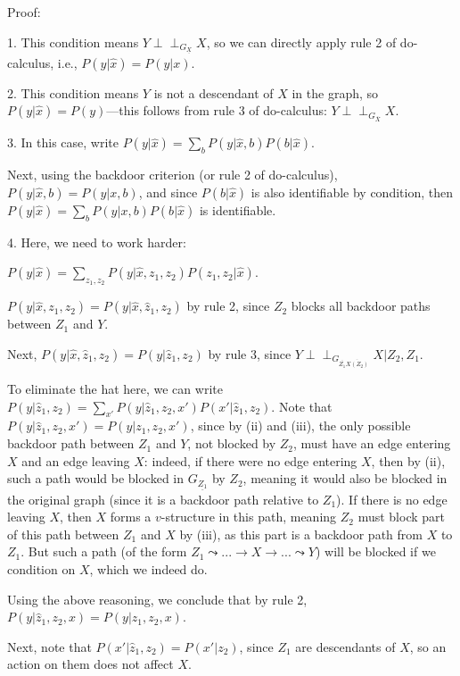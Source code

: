 \documentclass[fleqn]{article}
\newcommand{\independent}{\perp \!\!\! \perp}
\numberwithin{equation}{section}
\numberwithin{theorem}{section}
\numberwithin{figure}{section}
\numberwithin{lemma}{section}
\numberwithin{corollary}{section}
\begin{document}
Proof:

1. This condition means $Y \independent_{G_{\underline{X}}} X$, so we can directly apply rule 2 of do-calculus, i.e., $P(y|\hat x) = P(y|x)$.

2. This condition means $Y$ is not a descendant of $X$ in the graph, so $P(y|\hat x) = P(y)$—this follows from rule 3 of do-calculus: $Y \independent_{G_{\overline{X}}} X$.

3. In this case, write $P(y|\hat x) = \sum\limits_{b} P(y|\hat x, b)P(b|\hat x)$.

Next, using the backdoor criterion (or rule 2 of do-calculus), $P(y|\hat x, b) = P(y|x, b)$, and since $P(b|\hat x)$ is also identifiable by condition, then $P(y|\hat x) = \sum\limits_{b} P(y|x, b)P(b|\hat x)$ is identifiable.

4. Here, we need to work harder:

$P(y|\hat x) = \sum\limits_{z_1,z_2}P(y|\hat x, z_1, z_2)P(z_1,z_2|\hat x)$.

$P(y|\hat x, z_1, z_2) = P(y| \hat x, \hat z_1, z_2)$ by rule 2, since $Z_2$ blocks all backdoor paths between $Z_1$ and $Y$.

Next, $P(y| \hat x, \hat z_1, z_2) = P(y|\hat z_1, z_2)$ by rule 3, since $Y \independent_{G_{\overline{Z_1} \overline{X(Z_2)}}} X | Z_2, Z_1$.

To eliminate the hat here, we can write $P(y|\hat z_1, z_2) = \sum\limits_{x'} P(y|\hat z_1, z_2, x')P(x'|\hat z_1, z_2)$. Note that $P(y|\hat z_1, z_2, x') = P(y|z_1, z_2, x')$, since by (ii) and (iii), the only possible backdoor path between $Z_1$ and $Y$, not blocked by $Z_2$, must have an edge entering $X$ and an edge leaving $X$: indeed, if there were no edge entering $X$, then by (ii), such a path would be blocked in $G_{\underline{Z_1}}$ by $Z_2$, meaning it would also be blocked in the original graph (since it is a backdoor path relative to $Z_1$). If there is no edge leaving $X$, then $X$ forms a $v$-structure in this path, meaning $Z_2$ must block part of this path between $Z_1$ and $X$ by (iii), as this part is a backdoor path from $X$ to $Z_1$. But such a path (of the form $Z_1 \leadsto ... \rightarrow X \rightarrow ... \leadsto Y$) will be blocked if we condition on $X$, which we indeed do.

Using the above reasoning, we conclude that by rule 2, $P(y|\hat z_1, z_2, x) = P(y|z_1, z_2, x)$.

Next, note that $P(x'|\hat z_1, z_2) = P(x'|z_2)$, since $Z_1$ are descendants of $X$, so an action on them does not affect $X$.
\end{document}
